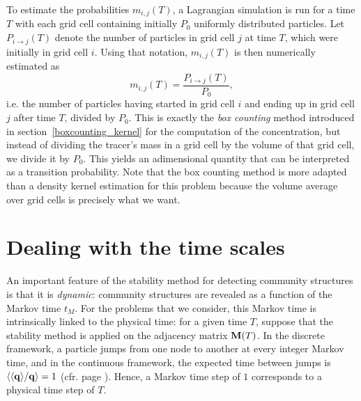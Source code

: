 To estimate the probabilities $m_{i,j}(T)$, a Lagrangian simulation is run for a time $T$ with each grid cell containing initially $P_0$ uniformly distributed particles. Let $P_{i \rightarrow j}(T)$ denote the number of particles in grid cell $j$ at time $T$, which were initially in grid cell $i$. Using that notation, $m_{i,j}(T)$ is then numerically estimated as 
\begin{equation}
	m_{i,j}(T) = \frac{P_{i \rightarrow j}(T)}{P_0},
\end{equation}
i.e. the number of particles having started in grid cell $i$ and ending up in grid cell $j$ after time $T$, divided by $P_0$. This is exactly the \textit{box counting} method introduced in section~\ref{boxcounting_kernel} for the computation of the concentration, but instead of dividing the tracer's mass in a grid cell by the volume of that grid cell, we divide it by $P_0$. This yields an adimensional quantity that can be interpreted as a transition probability. Note that the box counting method is more adapted than a density kernel estimation for this problem because the volume average over grid cells is precisely what we want.

\section{Dealing with the time scales}
An important feature of the stability method for detecting community structures is that it is \textit{dynamic}: community structures are revealed as a function of the Markov time $t_M$. For the problems that we consider, this Markov time is intrinsically linked to the physical time: for a given time $T$, suppose that the stability method is applied on the adjacency matrix $\mathbf M(T)$. In the discrete framework, a particle jumps from one node to another at every integer Markov time, and in the continuous framework, the expected time between jumps is $\langle \langle \mathbf q \rangle/\mathbf q \rangle = 1$ (cfr. page \pageref{expectedtimebetweenjumps}). Hence, a Markov time step of $1$ corresponds to a physical time step of $T$.

